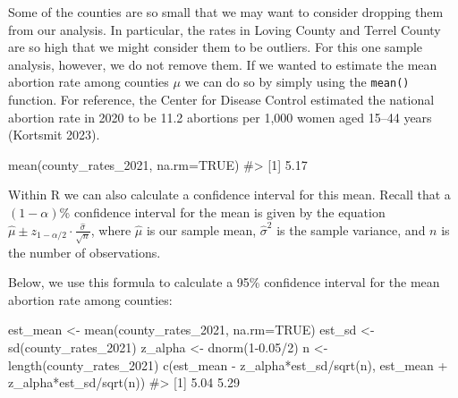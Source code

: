 \documentclass[
  letterpaper,
]{krantz}
\makeatletter
\newenvironment{Shaded}{\begin{snugshade}}{\end{snugshade}}
\newcommand{\AttributeTok}[1]{\textcolor[rgb]{0.40,0.45,0.13}{#1}}
\newcommand{\CommentTok}[1]{\textcolor[rgb]{0.37,0.37,0.37}{#1}}
\newcommand{\ConstantTok}[1]{\textcolor[rgb]{0.56,0.35,0.01}{#1}}
\newcommand{\DecValTok}[1]{\textcolor[rgb]{0.68,0.00,0.00}{#1}}
\newcommand{\FloatTok}[1]{\textcolor[rgb]{0.68,0.00,0.00}{#1}}
\newcommand{\FunctionTok}[1]{\textcolor[rgb]{0.28,0.35,0.67}{#1}}
\newcommand{\NormalTok}[1]{\textcolor[rgb]{0.00,0.23,0.31}{#1}}
\newcommand{\OtherTok}[1]{\textcolor[rgb]{0.00,0.23,0.31}{#1}}
\newcommand{\SpecialCharTok}[1]{\textcolor[rgb]{0.37,0.37,0.37}{#1}}
\newenvironment{kframe}{%
\medskip{}
\setlength{\fboxsep}{.8em}
 \def\at@end@of@kframe{}%
 \ifinner\ifhmode%
  \def\at@end@of@kframe{\end{minipage}}%
  \begin{minipage}{\columnwidth}%
 \fi\fi%
 \def\FrameCommand##1{\hskip\@totalleftmargin \hskip-\fboxsep
 \colorbox{shadecolor}{##1}\hskip-\fboxsep
     \hskip-\linewidth \hskip-\@totalleftmargin \hskip\columnwidth}%
 \MakeFramed {\advance\hsize-\width
   \@totalleftmargin\z@ \linewidth\hsize
   \@setminipage}}%
 {\par\unskip\endMakeFramed%
 \at@end@of@kframe}
\renewenvironment{Shaded}{\begin{kframe}}{\end{kframe}}
\makeatother
\begin{document}
Some of the counties are so small that we may want to consider dropping
them from our analysis. In particular, the rates in Loving County and
Terrel County are so high that we might consider them to be outliers.
For this one sample analysis, however, we do not remove them. If we
wanted to estimate the mean abortion rate among counties \(\mu\) we can
do so by simply using the \texttt{mean()} function. For reference, the
Center for Disease Control estimated the national abortion rate in 2020
to be 11.2 abortions per 1,000 women aged 15--44 years (Kortsmit 2023).

\begin{Shaded}
\begin{Highlighting}[]
\FunctionTok{mean}\NormalTok{(county\_rates\_2021, }\AttributeTok{na.rm=}\ConstantTok{TRUE}\NormalTok{)}
\CommentTok{\#\textgreater{} [1] 5.17}
\end{Highlighting}
\end{Shaded}

Within R we can also calculate a confidence interval for this mean.
Recall that a \((1-\alpha)\)\% confidence interval for the mean is given
by the equation
\(\hat{\mu} \pm z_{1-\alpha/2} \cdot \frac{\hat{\sigma}}{\sqrt{n}}\),
where \(\hat{\mu}\) is our sample mean, \(\hat{\sigma}^2\) is the sample
variance, and \(n\) is the number of observations.

Below, we use this formula to calculate a 95\% confidence interval for
the mean abortion rate among counties:

\begin{Shaded}
\begin{Highlighting}[]
\NormalTok{est\_mean }\OtherTok{\textless{}{-}} \FunctionTok{mean}\NormalTok{(county\_rates\_2021, }\AttributeTok{na.rm=}\ConstantTok{TRUE}\NormalTok{)}
\NormalTok{est\_sd }\OtherTok{\textless{}{-}} \FunctionTok{sd}\NormalTok{(county\_rates\_2021)}
\NormalTok{z\_alpha }\OtherTok{\textless{}{-}} \FunctionTok{dnorm}\NormalTok{(}\DecValTok{1}\FloatTok{{-}0.05}\SpecialCharTok{/}\DecValTok{2}\NormalTok{)}
\NormalTok{n }\OtherTok{\textless{}{-}} \FunctionTok{length}\NormalTok{(county\_rates\_2021)}
\FunctionTok{c}\NormalTok{(est\_mean }\SpecialCharTok{{-}}\NormalTok{ z\_alpha}\SpecialCharTok{*}\NormalTok{est\_sd}\SpecialCharTok{/}\FunctionTok{sqrt}\NormalTok{(n), }
\NormalTok{  est\_mean }\SpecialCharTok{+}\NormalTok{ z\_alpha}\SpecialCharTok{*}\NormalTok{est\_sd}\SpecialCharTok{/}\FunctionTok{sqrt}\NormalTok{(n))}
\CommentTok{\#\textgreater{} [1] 5.04 5.29}
\end{Highlighting}
\end{Shaded}
\end{document}
